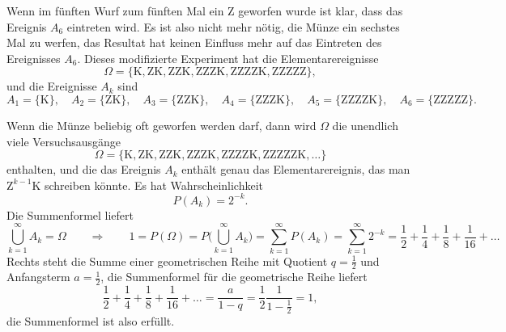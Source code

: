 \begin{loesung}
\begin{teilaufgaben}
Wenn im fünften Wurf zum fünften Mal ein Z geworfen wurde ist klar,
dass das Ereignis $A_6$ eintreten wird.
Es ist also nicht mehr nötig, die Münze ein sechstes Mal zu werfen, 
das Resultat hat keinen Einfluss mehr auf das Eintreten des Ereignisses
$A_6$.
Dieses modifizierte Experiment hat die Elementarereignisse
\[
\Omega = \{
\text{K},
\text{ZK},
\text{ZZK},
\text{ZZZK},
\text{ZZZZK},
\text{ZZZZZ}
\},
\]
und die Ereignisse $A_k$ sind
\[
A_1=\{\text{K}\},\quad
A_2=\{\text{ZK}\},\quad
A_3=\{\text{ZZK}\},\quad
A_4=\{\text{ZZZK}\},\quad
A_5=\{\text{ZZZZK}\},\quad
A_6=\{\text{ZZZZZ}\}.
\]
\item
Wenn die Münze beliebig oft geworfen werden darf, dann wird $\Omega$ die unendlich
viele Versuchsausgänge
\[
\Omega = \{
\text{K},
\text{ZK},
\text{ZZK},
\text{ZZZK},
\text{ZZZZK},
\text{ZZZZZK},
\dots
\}
\]
enthalten, und die das Ereignis $A_k$ enthält genau das Elementarereignis,
das man $\text{Z}^{k-1}\text{K}$ schreiben könnte.
Es hat Wahrscheinlichkeit
\[
P(A_k)=2^{-k}.
\]
Die Summenformel liefert
\[
\bigcup_{k=1}^\infty A_k=\Omega
\qquad\Rightarrow\qquad
1=P(\Omega)=P\biggl(
\bigcup_{k=1}^\infty A_k
\biggr)
=\sum_{k=1}^\infty P(A_k)=\sum_{k=1}^\infty 2^{-k}=
\frac12+\frac14+\frac18+\frac1{16}+\dots
\]
Rechts steht die Summe einer geometrischen Reihe mit Quotient $q=\frac12$ und
Anfangsterm $a=\frac12$, die Summenformel für die geometrische Reihe liefert
\[
\frac12+\frac14+\frac18+\frac1{16}+\dots=\frac{a}{1-q}=\frac12\frac1{1-\frac12}=1,
\]
die Summenformel ist also erfüllt.
\qedhere
\end{teilaufgaben}
\end{loesung}

